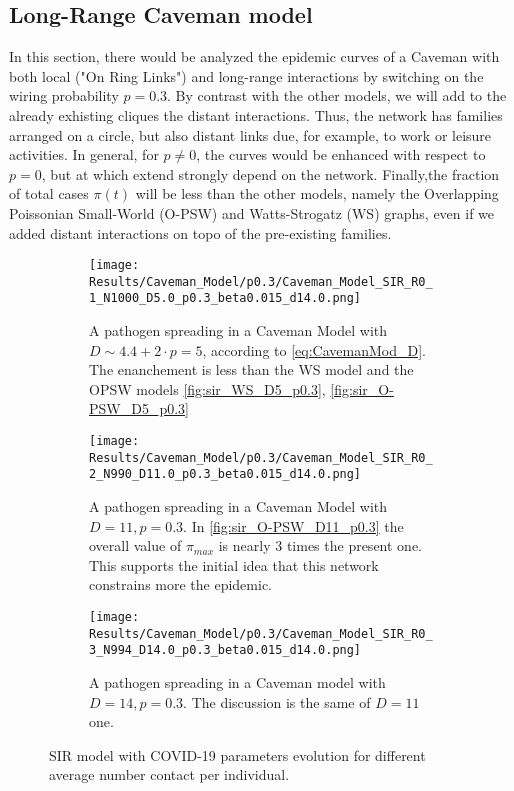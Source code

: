 \documentclass[a4paper,10pt,twoside]{book} %
\theoremstyle{definition}
\begin{document}
\clearpage
\subsection{Long-Range Caveman model}
\label{sec:res_LRCM}

In this section, there would be analyzed the epidemic curves of a Caveman with both local ("On Ring Links") and long-range interactions by switching on the wiring probability $p = 0.3$. By contrast with the other models, we will add to the already exhisting cliques the distant interactions.
Thus, the network has families arranged on a circle, but also distant links due, for example, to work or leisure activities.
In general, for $ p \neq 0$, the curves would be enhanced with respect to $ p = 0$, but at which extend strongly depend on the network. Finally,the fraction of total cases $\pi(t)$ will be less than the other models, namely the Overlapping Poissonian Small-World (O-PSW) and Watts-Strogatz (WS) graphs, even if we added distant interactions on topo of the pre-existing families.
\begin{figure}[htbp]
	\centering
	\begin{subfigure}{0.9\linewidth}
		\texttt{[image: Results/Caveman\_Model/p0.3/Caveman\_Model\_SIR\_R0\_1\_N1000\_D5.0\_p0.3\_beta0.015\_d14.0.png]}
		\caption{A pathogen spreading in a Caveman Model with $D \sim 4.4+ 2\cdot p = 5$, according to \autoref{eq:CavemanMod_D}. The enanchement is less than the WS model and the OPSW models \autoref{fig:sir_WS_D5_p0.3}, \autoref{fig:sir_O-PSW_D5_p0.3}}
		\label{fig:sir_CM_D4_OR1_p0.3}
	\end{subfigure}
	\par\smallskip
	\begin{subfigure}{0.9\linewidth}
		\texttt{[image: Results/Caveman\_Model/p0.3/Caveman\_Model\_SIR\_R0\_2\_N990\_D11.0\_p0.3\_beta0.015\_d14.0.png]}
		\caption{A pathogen spreading in a Caveman Model with $D = 11, p = 0.3$. In \autoref{fig:sir_O-PSW_D11_p0.3} the overall value of $ \pi_{max}$ is nearly $3$ times the present one. This supports the initial idea that this network constrains more the epidemic.}
		\label{fig:sir_CM_D11_p0.3}
	\end{subfigure}
	\par\smallskip
	\begin{subfigure}{0.9\linewidth}
		\texttt{[image: Results/Caveman\_Model/p0.3/Caveman\_Model\_SIR\_R0\_3\_N994\_D14.0\_p0.3\_beta0.015\_d14.0.png]}
		\caption{A pathogen spreading in a Caveman model with $D = 14, p = 0.3$. The discussion is the same of $D = 11$ one.}
		\label{fig:sir_CM_D13_p0.3}
	\end{subfigure}
	\caption{SIR model with COVID-19 parameters evolution for different average number contact per individual.}
	\label{fig:sir_CM_COVID_p0.3}
\end{figure}
\end{document}
